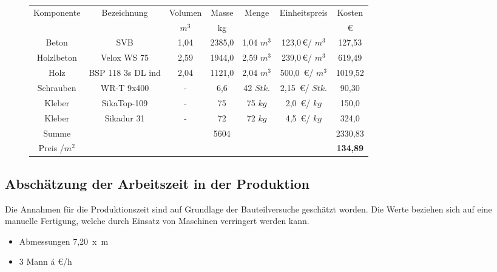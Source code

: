 \begin{figure}[h!]
\begin{center}
\begin{tabular}{|c|c|c|c|c|c|c|}
\hline 
Komponente & Bezeichnung & Volumen & Masse & Menge & Einheitspreis & Kosten \\ 

 &  & $m^{3}$ & kg &  &  & \euro \\ 
\hline \hline
Beton & SVB & 1,04 & 2385,0  & 1,04 $m^{3}$ & 123,0\,\euro / $m^{3}$ & 127,53 \\ 
\hline 
Holzlbeton & Velox WS 75 & 2,59 & 1944,0  & 2,59 $m^{3}$ & 239,0\,\euro / $m^{3}$ & 619,49 \\ 
\hline 
Holz & BSP 118 3s DL ind & 2,04 & 1121,0 & 2,04 $m^{3}$ & 500,0 \,\euro / $m^{3}$ & 1019,52 \\ 
\hline 
Schrauben & WR-T 9x400 & - & 6,6 & 42 $Stk.$ & 2,15 \,\euro / $Stk.$ & 90,30 \\ 
\hline 
Kleber & SikaTop-109  & - & 75 & 75 $kg$ & 2,0 \,\euro / $kg$& 150,0 \\ 
Kleber & Sikadur 31  & - & 72  & 72 $kg$ & 4,5 \,\euro / $kg$& 324,0 \\ 
\hline \hline
Summe & &  & 5604 &  &  & 2330,83 \\ 
\hline 
Preis /$m^{2}$&  & &  &  &  & \textbf{134,89} \\ 
\hline 
\end{tabular} 
\end{center}
\end{figure}






\subsection{Abschätzung der  Arbeitszeit in der Produktion}

Die Annahmen für die Produktionszeit sind auf Grundlage der Bauteilversuche geschätzt worden.
Die Werte beziehen sich auf eine manuelle Fertigung, welche durch Einsatz von Maschinen verringert werden kann.


\begin{itemize}
\item Abmessungen 7,20\, x\, \unit[2,40]{m}
\item 3 Mann \'{a} \unit[30]{ \euro/h}
\end{itemize}

